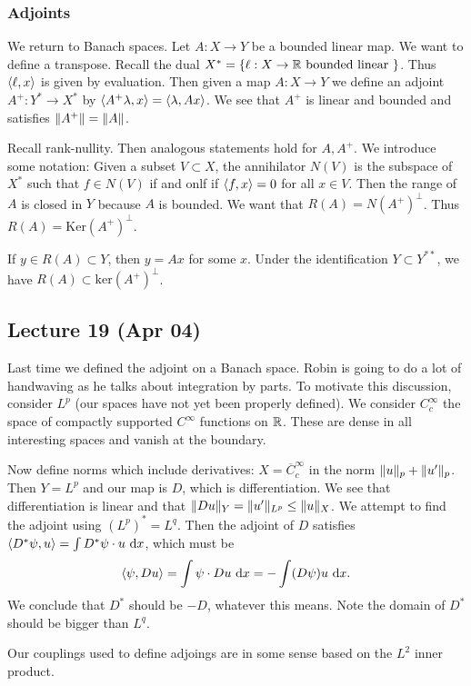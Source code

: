 \documentclass[10pt, twoside]{article}
\renewcommand{\d}{\ \mathrm{d}}
\begin{document}
    \subsubsection{Adjoints}
    We return to Banach spaces. Let $A:X \to Y$ be a bounded linear map. We want to define a transpose. Recall the dual $X^* = \{\ell:X \to \mathbb{R} \text{ bounded linear } \}$. Thus $\langle\ell,x\rangle$ is given by evaluation. Then given a map $A:X \to Y$ we define an adjoint $A^+: Y^* \to X^*$ by $\langle A^+ \lambda,x\rangle = \langle\lambda, Ax\rangle$. We see that $A^+$ is linear and bounded and satisfies $\lVert A^+\rVert = \lVert A\rVert$.

    Recall rank-nullity. Then analogous statements hold for $A,A^+$. We introduce some notation: Given a subset $V \subset X$, the annihilator $N(V)$ is the subspace of $X^*$ such that $f \in N(V)$ if and onlf if $\langle f,x\rangle = 0$ for all $x \in V$. Then the range of $A$ is closed in $Y$ because $A$ is bounded. We want that $R(A) = N(A^+)^{\perp}$. Thus $R(A) = \mathrm{Ker}(A^+)^{\perp}$.
        
    If $y \in R(A) \subset Y$, then $y=Ax$ for some $x$. Under the identification $Y \subset Y^{**}$, 
    we have $R(A) \subset \mathrm{ker}(A^+)^{\perp}$.

    \subsection{Lecture 19 (Apr 04)}
    Last time we defined the adjoint on a Banach space. Robin is going to do a lot of handwaving as he talks about integration by parts. To motivate this discussion, consider $L^p$ (our spaces have not yet been properly defined). We consider $C_c^{\infty}$ the space of compactly supported $C^{\infty}$ functions on $\mathbb{R}$. These are dense in all interesting spaces and vanish at the boundary.

    Now define norms which include derivatives: $X = \overline{C}_c^{\infty}$ in the norm $\lVert u\rVert_p + \lVert u'\rVert_p$. Then $Y = L^p$ and our map is $D$, which is differentiation. We see that differentiation is linear and that $\lVert Du\rVert_Y = \lVert u'\rVert_{L^p} \leq \lVert u\rVert_X$. We attempt to find the adjoint using $(L^p)^* = L^q$. Then the adjoint of $D$ satisfies $\gen{D^* \psi, u} = \int D^* \psi \cdot u \d x$, which must be \[\gen{\psi, Du} = \int \psi \cdot Du \d x = - \int (D \psi) u \d x.\] We conclude that $D^*$ should be $-D$, whatever this means. Note the domain of $D^*$ should be bigger than $L^q$. 

    \begin{rmk}
        Our couplings used to define adjoings are in some sense based on the $L^2$ inner product.
    \end{rmk}
\end{document}

